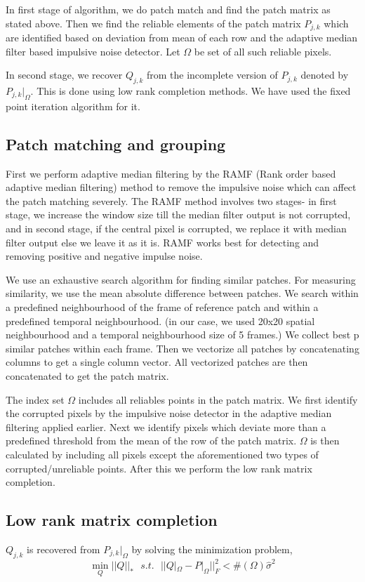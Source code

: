 \documentclass{article}
\begin{document}
In first stage of algorithm, we do patch match and find the patch matrix as stated above. Then we find the reliable elements of the patch matrix $P_{j,k}$ which are identified based on deviation from mean of each row and the adaptive median filter based impulsive noise detector. Let $\Omega$ be set of all such reliable pixels. 

In second stage, we recover $Q_{j,k}$ from the incomplete version of $P_{j,k}$ denoted by $P_{j,k}|_{\Omega}$. This is done using low rank completion methods. We have used the fixed point iteration algorithm for it. 


\subsection{Patch matching and grouping}
First we perform adaptive median filtering by the RAMF (Rank order based adaptive median filtering) method \cite{median} to remove the impulsive noise which can affect the patch matching severely. The RAMF method involves two stages- in first stage, we increase the window size till the median filter output is not corrupted, and in second stage, if the central pixel is corrupted, we replace it with median filter output else we leave it as it is. RAMF works best for detecting and removing positive and negative impulse noise.

We use an exhaustive search algorithm for finding similar patches. For measuring similarity, we use the mean absolute difference between patches. We search within a predefined neighbourhood of the frame of reference patch and within a predefined temporal neighbourhood. (in our case, we used 20x20 spatial neighbourhood and a temporal neighbourhood size of 5 frames.) We collect best p similar patches within each frame. Then we vectorize all patches by concatenating columns to get a single column vector. All vectorized patches are then concatenated to get the patch matrix. 

The index set $\Omega$ includes all reliables points in the patch matrix. We first identify the corrupted pixels by the impulsive noise detector in the adaptive median filtering applied earlier. Next we identify pixels which deviate more than a predefined threshold from the mean of the row of the patch matrix. $\Omega$ is then calculated by including all pixels except the aforementioned two types of corrupted/unreliable points. After this we perform the low rank matrix completion.


\subsection{Low rank matrix completion}
$Q_{j,k}$ is recovered from $P_{j,k}|_{\Omega}$ by solving the minimization problem,
\begin{equation*}
    \min_{Q} ||Q||_{*} \text{ } s.t. \text{ } ||Q|_{\Omega} - P|_{\Omega}||_F^2  < \#(\Omega) \hat{\sigma}^2
\end{equation*}
\end{document}

